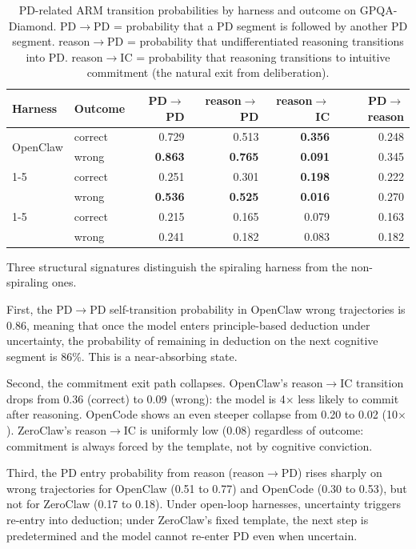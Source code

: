 \begin{table}[t]
\centering
\small
\caption{%
  PD-related ARM transition probabilities by harness and outcome on
  GPQA-Diamond.
  PD$\to$PD = probability that a PD segment is followed by another PD segment.
  reason$\to$PD = probability that undifferentiated reasoning transitions into PD.
  reason$\to$IC = probability that reasoning transitions to intuitive commitment
  (the natural exit from deliberation).
}
\label{tab:cross-pd-transition}
\setlength{\tabcolsep}{4pt}
\begin{tabular}{llrrrr}
\toprule
Harness & Outcome & PD$\to$PD & reason$\to$PD & reason$\to$IC & PD$\to$reason \\
\midrule
\multirow{2}{*}{OpenClaw}
  & correct & 0.729 & 0.513 & \textbf{0.356} & 0.248 \\
  & wrong   & \textbf{0.863} & \textbf{0.765} & \textbf{0.091} & 0.345 \\
\cmidrule{1-5}
\multirow{2}{*}{OpenCode}
  & correct & 0.251 & 0.301 & \textbf{0.198} & 0.222 \\
  & wrong   & \textbf{0.536} & \textbf{0.525} & \textbf{0.016} & 0.270 \\
\cmidrule{1-5}
\multirow{2}{*}{ZeroClaw}
  & correct & 0.215 & 0.165 & 0.079 & 0.163 \\
  & wrong   & 0.241 & 0.182 & 0.083 & 0.182 \\
\bottomrule
\end{tabular}
\end{table}

Three structural signatures distinguish the spiraling harness from the
non-spiraling ones.

First, the PD$\to$PD self-transition probability in OpenClaw wrong
trajectories is 0.86, meaning that once the model enters principle-based
deduction under uncertainty, the probability of remaining in deduction on the
next cognitive segment is 86\%.
This is a near-absorbing state.

Second, the commitment exit path collapses.
OpenClaw's reason$\to$IC transition drops from 0.36 (correct) to 0.09
(wrong): the model is 4$\times$ less likely to commit after reasoning.
OpenCode shows an even steeper collapse from 0.20 to 0.02 (10$\times$).
ZeroClaw's reason$\to$IC is uniformly low (0.08) regardless of outcome:
commitment is always forced by the template, not by cognitive conviction.

Third, the PD entry probability from reason (reason$\to$PD) rises sharply
on wrong trajectories for OpenClaw (0.51 to 0.77) and OpenCode (0.30 to
0.53), but not for ZeroClaw (0.17 to 0.18).
Under open-loop harnesses, uncertainty triggers re-entry into deduction;
under ZeroClaw's fixed template, the next step is predetermined and the
model cannot re-enter PD even when uncertain.

